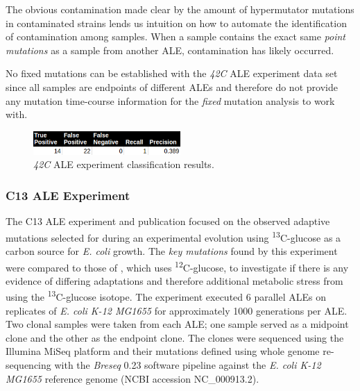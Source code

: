 \documentclass[12pt,final,masters,chapterheads]{ucsd}  %
\begin{document}
The obvious contamination made clear by the amount of hypermutator mutations in contaminated strains lends us intuition on how to automate the identification of contamination among samples. When a sample contains the exact same \textit{point mutations} as a sample from another ALE, contamination has likely occurred.

No fixed mutations can be established with the \textit{42C} ALE experiment data set since all samples are endpoints of different ALEs and therefore do not provide any mutation time-course information for the \textit{fixed} mutation analysis to work with.
\begin{figure}[H]
  \centering
   \caption{\textit{42C} ALE experiment classification results.}
  \includegraphics[width=0.5\textwidth]{42c_precision_recall.png}
\end{figure}
\subsubsection{C13 ALE Experiment}
The C13 ALE experiment and publication focused on the observed adaptive mutations selected for during an experimental evolution using \textsuperscript{13}C-glucose as a carbon source for \textit{E. coli} growth. The \textit{key mutations} found by this experiment were compared to those of \cite{pmid25304508}, which uses \textsuperscript{12}C-glucose, to investigate if there is any evidence of differing adaptations and therefore additional metabolic stress from using the \textsuperscript{13}C-glucose isotope. The experiment executed 6 parallel ALEs  on replicates of \textit{E. coli K-12 MG1655} for approximately 1000 generations per ALE. Two clonal samples were taken from each ALE; one sample served as a midpoint clone and the other as the endpoint clone. The clones were sequenced using the Illumina MiSeq platform and their mutations defined using whole genome re-sequencing with the \textit{Breseq} 0.23 software pipeline against the \textit{E. coli K-12 MG1655} reference genome (NCBI accession NC\_000913.2).
\end{document}
